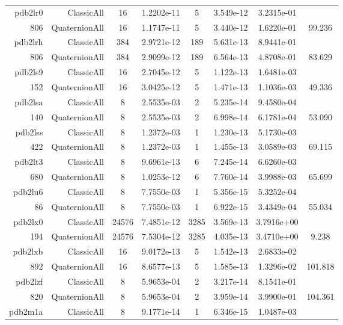 \begin{xltabular}{\textwidth}{r|rcS[table-format=1.4e+2]cS[table-format=1.3e+2]S[table-format=1.4e+2]S[table-format=-1.3]}
pdb2lr0 & ClassicAll & 16 & 1.2202e-11 & 5 & 3.549e-12 & 3.2315e-01 & \\
806 & QuaternionAll & 16 & 1.1747e-11 & 5 & 3.440e-12 & 1.6220e-01 & 99.236\\  \addlinespace
pdb2lrh & ClassicAll & 384 & 2.9721e-12 & 189 & 5.631e-13 & 8.9441e-01 & \\
806 & QuaternionAll & 384 & 2.9099e-12 & 189 & 6.564e-13 & 4.8708e-01 & 83.629\\  \addlinespace
pdb2ls9 & ClassicAll & 16 & 2.7045e-12 & 5 & 1.122e-13 & 1.6481e-03 & \\
152 & QuaternionAll & 16 & 3.0425e-12 & 5 & 1.471e-13 & 1.1036e-03 & 49.336\\  \addlinespace
pdb2lsa & ClassicAll & 8 & 2.5535e-03 & 2 & 5.235e-14 & 9.4580e-04 & \\
140 & QuaternionAll & 8 & 2.5535e-03 & 2 & 6.998e-14 & 6.1781e-04 & 53.090\\  \addlinespace
pdb2lss & ClassicAll & 8 & 1.2372e-03 & 1 & 1.230e-13 & 5.1730e-03 & \\
422 & QuaternionAll & 8 & 1.2372e-03 & 1 & 1.455e-13 & 3.0589e-03 & 69.115\\  \addlinespace
pdb2lt3 & ClassicAll & 8 & 9.6961e-13 & 6 & 7.245e-14 & 6.6260e-03 & \\
680 & QuaternionAll & 8 & 1.0253e-12 & 6 & 7.760e-14 & 3.9988e-03 & 65.699\\  \addlinespace
pdb2lu6 & ClassicAll & 8 & 7.7550e-03 & 1 & 5.356e-15 & 5.3252e-04 & \\
86 & QuaternionAll & 8 & 7.7550e-03 & 1 & 6.922e-15 & 3.4349e-04 & 55.034\\  \addlinespace
pdb2lx0 & ClassicAll & 24576 & 7.4851e-12 & 3285 & 3.569e-13 & 3.7916e+00 & \\
194 & QuaternionAll & 24576 & 7.5304e-12 & 3285 & 4.035e-13 & 3.4710e+00 & 9.238\\  \addlinespace
pdb2lxb & ClassicAll & 16 & 9.0172e-13 & 5 & 1.542e-13 & 2.6833e-02 & \\
892 & QuaternionAll & 16 & 8.6577e-13 & 5 & 1.585e-13 & 1.3296e-02 & 101.818\\  \addlinespace
pdb2lzf & ClassicAll & 8 & 5.9653e-04 & 2 & 3.217e-14 & 8.1541e-01 & \\
820 & QuaternionAll & 8 & 5.9653e-04 & 2 & 3.959e-14 & 3.9900e-01 & 104.361\\  \addlinespace
pdb2m1a & ClassicAll & 8 & 9.1771e-14 & 1 & 6.346e-15 & 1.0487e-03 & \\

\end{xltabular}
